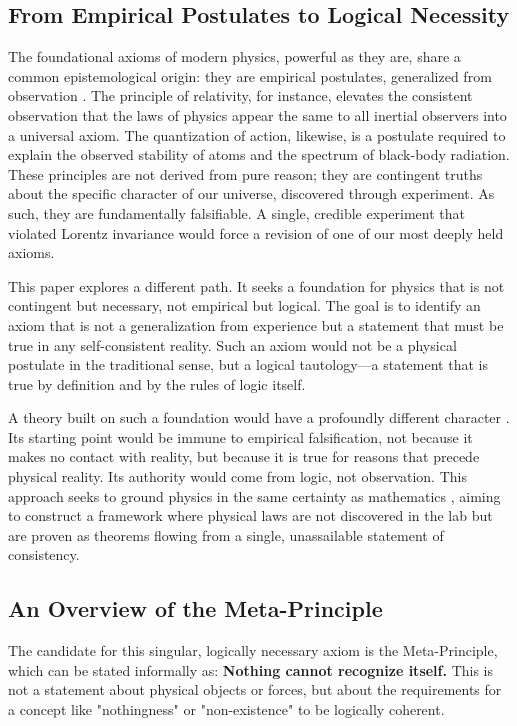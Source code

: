 \documentclass[axioms,article,submit,pdftex,oneauthor]{Definitions/mdpi}
\begin{document}
\subsection{From Empirical Postulates to Logical Necessity}
The foundational axioms of modern physics, powerful as they are, share a common epistemological origin: they are empirical postulates, generalized from observation \cite{kuhn1962structure, quine1951two}. The principle of relativity, for instance, elevates the consistent observation that the laws of physics appear the same to all inertial observers into a universal axiom. The quantization of action, likewise, is a postulate required to explain the observed stability of atoms and the spectrum of black-body radiation. These principles are not derived from pure reason; they are contingent truths about the specific character of our universe, discovered through experiment. As such, they are fundamentally falsifiable. A single, credible experiment that violated Lorentz invariance would force a revision of one of our most deeply held axioms.

This paper explores a different path. It seeks a foundation for physics that is not contingent but necessary, not empirical but logical. The goal is to identify an axiom that is not a generalization from experience but a statement that must be true in any self-consistent reality. Such an axiom would not be a physical postulate in the traditional sense, but a logical tautology—a statement that is true by definition and by the rules of logic itself.

A theory built on such a foundation would have a profoundly different character \cite{deutsch1997fabric}. Its starting point would be immune to empirical falsification, not because it makes no contact with reality, but because it is true for reasons that precede physical reality. Its authority would come from logic, not observation. This approach seeks to ground physics in the same certainty as mathematics \cite{hilbert1950principles, Tegmark2008}, aiming to construct a framework where physical laws are not discovered in the lab but are proven as theorems flowing from a single, unassailable statement of consistency.

\subsection{An Overview of the Meta-Principle}
The candidate for this singular, logically necessary axiom is the Meta-Principle, which can be stated informally as: \textbf{Nothing cannot recognize itself.} This is not a statement about physical objects or forces, but about the requirements for a concept like "nothingness" or "non-existence" to be logically coherent.
\end{document}

